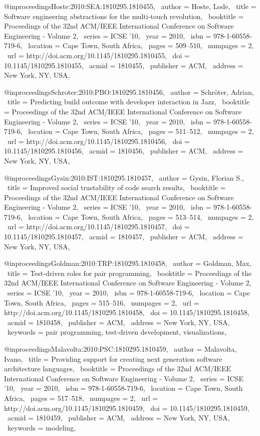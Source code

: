 @inproceedings{Hoste:2010:SEA:1810295.1810455,
 author = {Hoste, Lode},
 title = {Software engineering abstractions for the multi-touch revolution},
 booktitle = {Proceedings of the 32nd ACM/IEEE International Conference on Software Engineering - Volume 2},
 series = {ICSE '10},
 year = {2010},
 isbn = {978-1-60558-719-6},
 location = {Cape Town, South Africa},
 pages = {509--510},
 numpages = {2},
 url = {http://doi.acm.org/10.1145/1810295.1810455},
 doi = {10.1145/1810295.1810455},
 acmid = {1810455},
 publisher = {ACM},
 address = {New York, NY, USA},
} 

@inproceedings{Schroter:2010:PBO:1810295.1810456,
 author = {Schr\"{o}ter, Adrian},
 title = {Predicting build outcome with developer interaction in Jazz},
 booktitle = {Proceedings of the 32nd ACM/IEEE International Conference on Software Engineering - Volume 2},
 series = {ICSE '10},
 year = {2010},
 isbn = {978-1-60558-719-6},
 location = {Cape Town, South Africa},
 pages = {511--512},
 numpages = {2},
 url = {http://doi.acm.org/10.1145/1810295.1810456},
 doi = {10.1145/1810295.1810456},
 acmid = {1810456},
 publisher = {ACM},
 address = {New York, NY, USA},
} 

@inproceedings{Gysin:2010:IST:1810295.1810457,
 author = {Gysin, Florian S.},
 title = {Improved social trustability of code search results},
 booktitle = {Proceedings of the 32nd ACM/IEEE International Conference on Software Engineering - Volume 2},
 series = {ICSE '10},
 year = {2010},
 isbn = {978-1-60558-719-6},
 location = {Cape Town, South Africa},
 pages = {513--514},
 numpages = {2},
 url = {http://doi.acm.org/10.1145/1810295.1810457},
 doi = {10.1145/1810295.1810457},
 acmid = {1810457},
 publisher = {ACM},
 address = {New York, NY, USA},
} 

@inproceedings{Goldman:2010:TRP:1810295.1810458,
 author = {Goldman, Max},
 title = {Test-driven roles for pair programming},
 booktitle = {Proceedings of the 32nd ACM/IEEE International Conference on Software Engineering - Volume 2},
 series = {ICSE '10},
 year = {2010},
 isbn = {978-1-60558-719-6},
 location = {Cape Town, South Africa},
 pages = {515--516},
 numpages = {2},
 url = {http://doi.acm.org/10.1145/1810295.1810458},
 doi = {10.1145/1810295.1810458},
 acmid = {1810458},
 publisher = {ACM},
 address = {New York, NY, USA},
 keywords = {pair programming, test-driven development, visualizations},
} 

@inproceedings{Malavolta:2010:PSC:1810295.1810459,
 author = {Malavolta, Ivano},
 title = {Providing support for creating next generation software architecture languages},
 booktitle = {Proceedings of the 32nd ACM/IEEE International Conference on Software Engineering - Volume 2},
 series = {ICSE '10},
 year = {2010},
 isbn = {978-1-60558-719-6},
 location = {Cape Town, South Africa},
 pages = {517--518},
 numpages = {2},
 url = {http://doi.acm.org/10.1145/1810295.1810459},
 doi = {10.1145/1810295.1810459},
 acmid = {1810459},
 publisher = {ACM},
 address = {New York, NY, USA},
 keywords = {modeling},
} 

